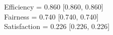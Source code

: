 \begin{tcolorbox}[colback=gray!3,colframe=gray!60,title=CARE Aggregate (5 seeds)]
Efficiency = 0.860 [0.860, 0.860]\\
Fairness   = 0.740 [0.740, 0.740]\\
Satisfaction = 0.226 [0.226, 0.226]
\end{tcolorbox}